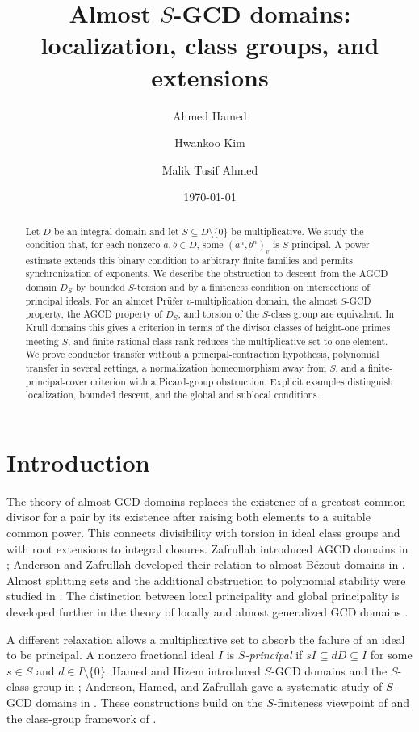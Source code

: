 \documentclass[11pt]{amsart}
\title[Almost $S$-GCD domains]{Almost $S$-GCD domains: localization, class groups, and extensions}
\author[A. Hamed]{Ahmed Hamed}
\author[H. Kim]{Hwankoo Kim}
\author[M.T. Ahmed]{Malik Tusif Ahmed}
\date{\today}
\theoremstyle{definition}
\theoremstyle{remark}
\begin{document}
\begin{abstract}
Let $D$ be an integral domain and let $S\subseteq D\setminus\{0\}$ be
multiplicative. We study the condition that, for each nonzero $a,b\in D$,
some $(a^n,b^n)_v$ is $S$-principal. A power estimate extends this binary
condition to arbitrary finite families and permits synchronization of
exponents. We describe the obstruction to descent from the AGCD domain
$D_S$ by bounded $S$-torsion and by a finiteness condition on intersections
of principal ideals. For an almost Pr\"ufer $v$-multiplication domain,
the almost $S$-GCD property, the AGCD property of $D_S$, and torsion of the
$S$-class group are equivalent. In Krull domains this gives a criterion
in terms of the divisor classes of height-one primes meeting $S$,
and finite rational class rank reduces the multiplicative set to one
element. We prove conductor transfer without a principal-contraction
hypothesis, polynomial transfer in several settings, a normalization
homeomorphism away from $S$, and a finite-principal-cover criterion with
a Picard-group obstruction. Explicit examples distinguish localization,
bounded descent, and the global and sublocal conditions.
\end{abstract}
\maketitle

\section{Introduction}\label{intro}

The theory of almost GCD domains replaces the existence of a greatest
common divisor for a pair by its existence after raising both elements
to a suitable common power. This connects divisibility with torsion in
ideal class groups and with root extensions to integral closures.
Zafrullah introduced AGCD domains in \cite{Z3}; Anderson and Zafrullah
developed their relation to almost B\'ezout domains in \cite{AZ-Bez}.
Almost splitting sets and the additional obstruction to polynomial
stability were studied in \cite{ATZ,AndersonChang2007}. The distinction
between local principality and global principality is developed further
in the theory of locally and almost generalized GCD domains
\cite{ACZlocal}.

A different relaxation allows a multiplicative set to absorb the
failure of an ideal to be principal. A nonzero fractional ideal $I$ is
\emph{$S$-principal} if $sI\subseteq dD\subseteq I$ for some $s\in S$
and $d\in I\setminus\{0\}$. Hamed and Hizem introduced $S$-GCD domains
and the $S$-class group in \cite{Hamed}; Anderson, Hamed, and Zafrullah
gave a systematic study of $S$-GCD domains in \cite{AHZ}.
These constructions build on the $S$-finiteness viewpoint of
\cite{Anderson1} and the class-group framework of \cite{Alain}.
\end{document}
